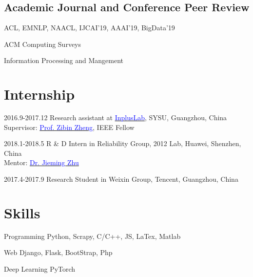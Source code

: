 \documentclass[12pt,letterpaper]{report}
\newcommand{\listitemspace}{0.5em}
\renewenvironment{itemize}
{\begin{list}{}{\setlength{\leftmargin}{0em}
                \setlength{\parskip}{0em}
                \setlength{\itemsep}{\listitemspace}
                \setlength{\parsep}{\listitemspace}}}
{\end{list}}
\begin{document}
    \subsection*{Academic Journal and Conference Peer Review}
    \begin{itemize}
        \item ACL, EMNLP, NAACL, IJCAI'19, AAAI'19, BigData'19
        \item ACM Computing Surveys
        \item Information Processing and Mangement
    \end{itemize}

    \section*{Internship}
    \begin{tablist}
        \item[2016.9-2017.12] \tab{}Research assistant at \href{https://inpluslab.com/}{\textcolor{blue}{InplusLab}}, SYSU, Guangzhou, China \\ Supervisor: \href{https://www.zibinzheng.com/}{\textcolor{blue}{Prof. Zibin Zheng}}, IEEE Fellow
        \item[2018.1-2018.5] \tab{}R \& D Intern in Reliability Group, 2012 Lab, Huawei, Shenzhen, China \\ Mentor: \href{https://jiemingzhu.github.io/}{\textcolor{blue}{Dr. Jieming Zhu}}
        \item[2017.4-2017.9] \tab{}Research Student in Weixin Group, Tencent, Guangzhou, China
    \end{tablist}

    \section*{Skills}
    \begin{tablist}
        \item[Programming] \tab{}Python, Scrapy, C/C++, JS, LaTex, Matlab
        \item[Web] \tab{}Django, Flask, BootStrap, Php
        \item[Deep Learning] \tab{}PyTorch
    \end{tablist}
\end{document}
